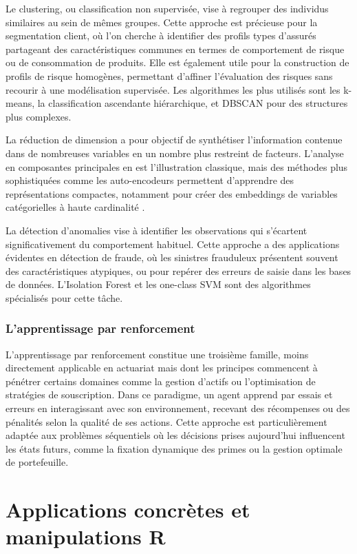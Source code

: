 \documentclass[
  french,
]{book}
\theoremstyle{definition}
\theoremstyle{definition}
\theoremstyle{definition}
\theoremstyle{definition}
\theoremstyle{remark}
\begin{document}
Le clustering, ou classification non supervisée, vise à regrouper des individus similaires au sein de mêmes groupes. Cette approche est précieuse pour la segmentation client, où l'on cherche à identifier des profils types d'assurés partageant des caractéristiques communes en termes de comportement de risque ou de consommation de produits. Elle est également utile pour la construction de profils de risque homogènes, permettant d'affiner l'évaluation des risques sans recourir à une modélisation supervisée. Les algorithmes les plus utilisés sont les k-means, la classification ascendante hiérarchique, et DBSCAN pour des structures plus complexes.

La réduction de dimension a pour objectif de synthétiser l'information contenue dans de nombreuses variables en un nombre plus restreint de facteurs. L'analyse en composantes principales en est l'illustration classique, mais des méthodes plus sophistiquées comme les auto-encodeurs permettent d'apprendre des représentations compactes, notamment pour créer des embeddings de variables catégorielles à haute cardinalité \citet{delong2021gamma}.

La détection d'anomalies vise à identifier les observations qui s'écartent significativement du comportement habituel. Cette approche a des applications évidentes en détection de fraude, où les sinistres frauduleux présentent souvent des caractéristiques atypiques, ou pour repérer des erreurs de saisie dans les bases de données. L'Isolation Forest et les one-class SVM sont des algorithmes spécialisés pour cette tâche.

\subsubsection{L'apprentissage par renforcement}

L'apprentissage par renforcement constitue une troisième famille, moins directement applicable en actuariat mais dont les principes commencent à pénétrer certains domaines comme la gestion d'actifs ou l'optimisation de stratégies de souscription. Dans ce paradigme, un agent apprend par essais et erreurs en interagissant avec son environnement, recevant des récompenses ou des pénalités selon la qualité de ses actions. Cette approche est particulièrement adaptée aux problèmes séquentiels où les décisions prises aujourd'hui influencent les états futurs, comme la fixation dynamique des primes ou la gestion optimale de portefeuille.

\section{Applications concrètes et manipulations R}
\end{document}
